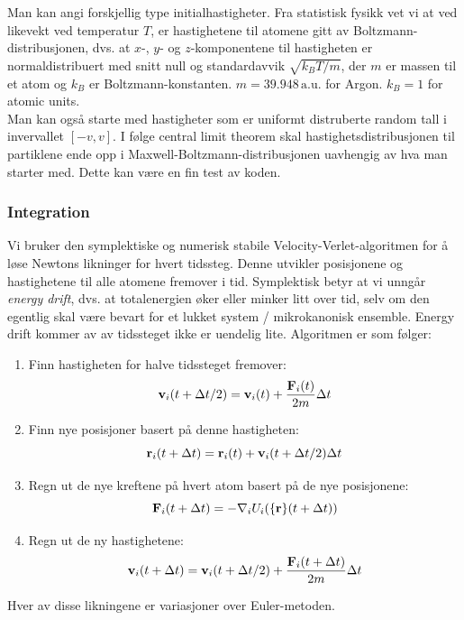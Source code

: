 \documentclass[english, a4paper]{article}
\begin{document}
\noindent
Man kan angi forskjellig type initialhastigheter.
Fra statistisk fysikk vet vi at ved likevekt ved temperatur $T$, er hastighetene til atomene
gitt av Boltzmann-distribusjonen, dvs. at $x$-, $y$- og $z$-komponentene til hastigheten er
normaldistribuert med snitt null og standardavvik $\sqrt{k_BT/m}$, der $m$ er massen til et atom
og $k_B$ er Boltzmann-konstanten. $m = 39.948\,\textrm{a.u.}$ for Argon. $k_B = 1$
for atomic units. \\

\noindent
Man kan også starte med hastigheter som er uniformt distruberte random tall i invervallet $[-v,v]$.
I følge central limit theorem skal hastighetsdistribusjonen til partiklene ende opp i
Maxwell-Boltzmann-distribusjonen uavhengig av hva man starter med. Dette kan være en fin test av koden.

\subsubsection{Integration}
Vi bruker den symplektiske og numerisk stabile Velocity-Verlet-algoritmen for å løse 
Newtons likninger for hvert tidssteg. Denne utvikler posisjonene og hastighetene til alle 
atomene fremover i tid. Symplektisk betyr at vi unngår \textit{energy drift}, dvs. at totalenergien
øker eller minker litt over tid, selv om den egentlig skal være bevart for et lukket system / 
mikrokanonisk ensemble. Energy drift kommer av av tidssteget ikke er uendelig lite. 
Algoritmen er som følger:
\begin{enumerate}
 \item Finn hastigheten for halve tidssteget fremover: 
 \begin{equation}
  {\bf v}_i(t + \Delta t/2) = {\bf v}_i(t) + \frac{{\bf F}_i(t)}{2m} \Delta t
 \end{equation}
 \item Finn nye posisjoner basert på denne hastigheten:
 \begin{equation}
  {\bf r}_i(t + \Delta t) = {\bf r}_i(t) + {\bf v}_i(t + \Delta t/2)\Delta t
 \end{equation}
 \item Regn ut de nye kreftene på hvert atom basert på de nye posisjonene:
 \begin{equation}
  {\bf F}_i(t + \Delta t) = -\nabla_iU_i({\bf \{r\}}(t + \Delta t))
 \end{equation}
 \item Regn ut de ny hastighetene:
 \begin{equation}
  {\bf v}_i(t + \Delta t) = {\bf v}_i(t+\Delta t/2) + \frac{{\bf F}_i(t + \Delta t)}{2m} \Delta t
 \end{equation}
\end{enumerate}
Hver av disse likningene er variasjoner over Euler-metoden.
\end{document}
